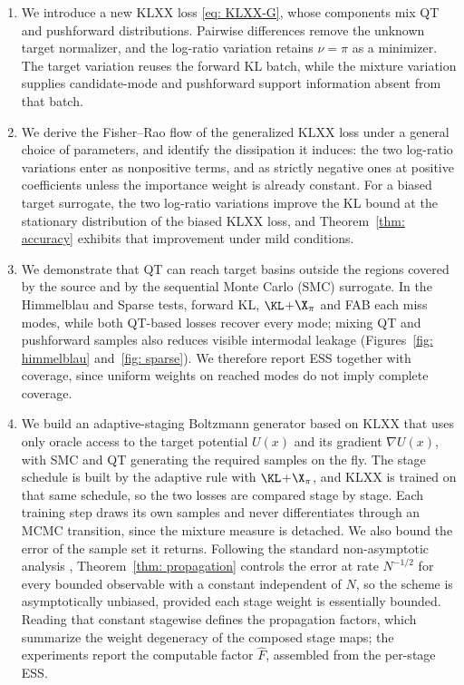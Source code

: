 \documentclass{article}
\begin{document}
\begin{enumerate}
	\setlength{\itemsep}{0pt}
	\item We introduce a new KLXX loss \eqref{eq: KLXX-G}, whose components mix QT and pushforward distributions. Pairwise differences remove the unknown target normalizer, and the log-ratio variation retains $\nu=\pi$ as a minimizer. The target variation reuses the forward KL batch, while the mixture variation supplies candidate-mode and pushforward support information absent from that batch.

	\item We derive the Fisher--Rao flow of the generalized KLXX loss under a general choice of parameters, and identify the dissipation it induces: the two log-ratio variations enter as nonpositive terms, and as strictly negative ones at positive coefficients unless the importance weight is already constant. For a biased target surrogate, the two log-ratio variations improve the KL bound at the stationary distribution of the biased KLXX loss, and Theorem~\ref{thm: accuracy} exhibits that improvement under mild conditions.

	\item We demonstrate that QT can reach target basins outside the regions covered by the source and by the sequential Monte Carlo (SMC) surrogate. In the Himmelblau and Sparse tests, forward KL, $\KL$+$\X_\pi$ and FAB each miss modes, while both QT-based losses recover every mode; mixing QT and pushforward samples also reduces visible intermodal leakage (Figures~\ref{fig: himmelblau} and~\ref{fig: sparse}). We therefore report ESS together with coverage, since uniform weights on reached modes do not imply complete coverage.

	\item We build an adaptive-staging Boltzmann generator based on KLXX that uses only oracle access to the target potential $U(x)$ and its gradient $\nabla U(x)$, with SMC and QT generating the required samples on the fly. The stage schedule is built by the adaptive rule with $\KL$+$\X_\pi$, and KLXX is trained on that same schedule, so the two losses are compared stage by stage. Each training step draws its own samples and never differentiates through an MCMC transition, since the mixture measure is detached. We also bound the error of the sample set it returns. Following the standard non-asymptotic analysis \citep{delmoral2004feynman,chopin2020introduction}, Theorem~\ref{thm: propagation} controls the error at rate $N^{-1/2}$ for every bounded observable with a constant independent of $N$, so the scheme is asymptotically unbiased, provided each stage weight is essentially bounded. Reading that constant stagewise defines the propagation factors, which summarize the weight degeneracy of the composed stage maps; the experiments report the computable factor $\hat F$, assembled from the per-stage ESS.
\end{enumerate}
\end{document}
